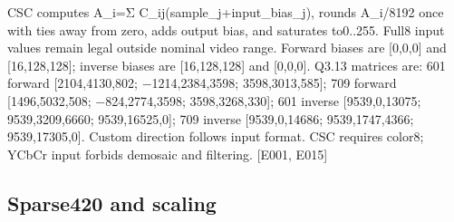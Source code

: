 \documentclass[11pt,a4paper]{article}
\begin{document}
CSC computes A\_\allowbreak{}i=\allowbreak{}Σ C\_\allowbreak{}ij(\allowbreak{}sample\_\allowbreak{}j+\allowbreak{}input\_\allowbreak{}bias\_\allowbreak{}j)\allowbreak{},\allowbreak{} rounds A\_\allowbreak{}i/\allowbreak{}8192 once with ties away from zero,\allowbreak{} adds output bias,\allowbreak{} and saturates to0..255. Full8 input values remain legal outside nominal video range. Forward biases are [\allowbreak{}0,\allowbreak{}0,\allowbreak{}0]\allowbreak{} and [\allowbreak{}16,\allowbreak{}128,\allowbreak{}128]\allowbreak{}; inverse biases are [16,128,128]\allowbreak{} and [\allowbreak{}0,\allowbreak{}0,\allowbreak{}0]\allowbreak{}. Q3.13 matrices are: 601 forward [\allowbreak{}2104,\allowbreak{}4130,\allowbreak{}802; {\vulcanmathsymbols −}1214,2384,\allowbreak{}3598; 3598,3013,585]\allowbreak{}; 709 forward [\allowbreak{}1496,\allowbreak{}5032,\allowbreak{}508; {\vulcanmathsymbols −}824,2774,\allowbreak{}3598; 3598,3268,330]\allowbreak{}; 601 inverse [\allowbreak{}9539,\allowbreak{}0,\allowbreak{}13075; 9539,3209,6660; 9539,\allowbreak{}16525,\allowbreak{}0]\allowbreak{}; 709 inverse [\allowbreak{}9539,\allowbreak{}0,\allowbreak{}14686; 9539,1747,4366; 9539,\allowbreak{}17305,\allowbreak{}0]\allowbreak{}. Custom direction follows input format. CSC requires color8; YCbCr input forbids demosaic and filtering. [\allowbreak{}E001,\allowbreak{} E015]\allowbreak{}

\subsection{Sparse420 and scaling}
\end{document}
